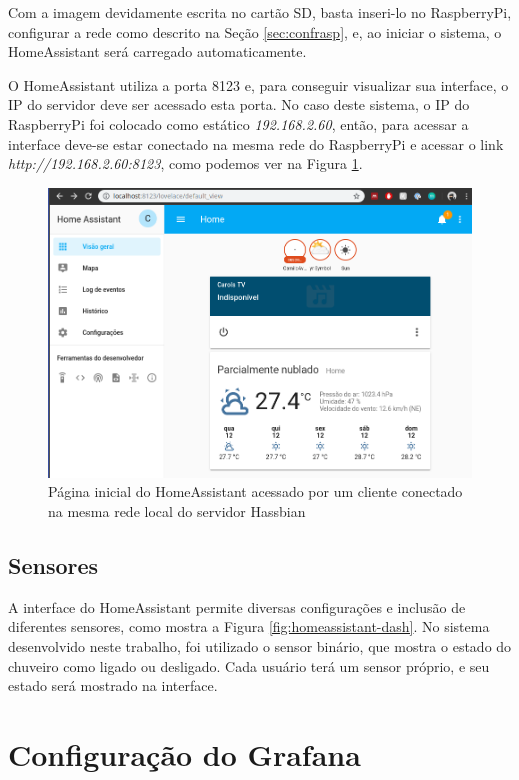 Com a imagem devidamente escrita no cartão SD, basta inseri-lo no RaspberryPi, configurar a rede como descrito na Seção \ref{sec:confrasp}, e, ao iniciar o sistema, o HomeAssistant será carregado automaticamente.

O HomeAssistant utiliza a porta 8123 e, para conseguir visualizar sua interface, o IP do servidor deve ser acessado esta porta. No caso deste sistema, o IP do RaspberryPi foi colocado como estático \textit{192.168.2.60}, então, para acessar a interface deve-se estar conectado na mesma rede do RaspberryPi e acessar o link \textit{http://192.168.2.60:8123}, como podemos ver na Figura \ref{fig:homeassistanthome}.

\begin{figure}[htbp]
	\centering
	\includegraphics[width=1\linewidth]{figuras/homeassistanthome.png}
	\caption{Página inicial do HomeAssistant acessado por um cliente conectado na mesma rede local do servidor Hassbian}
	\label{fig:homeassistanthome}
\end{figure}

\subsection{Sensores}

A interface do HomeAssistant permite diversas configurações e inclusão de diferentes sensores, como mostra a Figura \ref{fig:homeassistant-dash}. No sistema desenvolvido neste trabalho, foi utilizado o sensor binário, que mostra o estado do chuveiro como ligado ou desligado. Cada usuário terá um sensor próprio, e seu estado será mostrado na interface.


\section{Configuração do Grafana}

